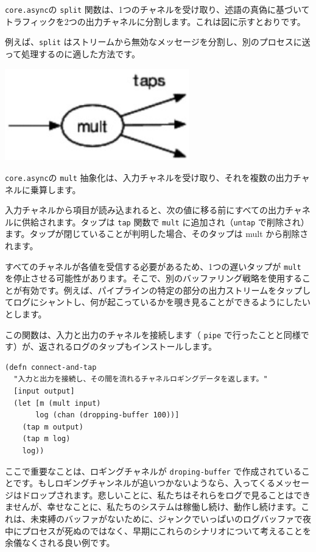 \texttt{core.async}の \texttt{split} 関数は、1つのチャネルを受け取り、述語の真偽に基づいてトラフィックを2つの出力チャネルに分割します。これは図に示すとおりです。

例えば、\texttt{split} はストリームから無効なメッセージを分割し、別のプロセスに送って処理するのに適した方法です。


\includegraphics[width=8cm]{fig_06_004.eps}

\texttt{core.async}の \texttt{mult} 抽象化は、入力チャネルを受け取り、それを複数の出力チャネルに乗算します。

入力チャネルから項目が読み込まれると、次の値に移る前にすべての出力チャネルに供給されます。タップは \texttt{tap} 関数で \texttt{mult} に追加され（\texttt{untap} で削除され）ます。タップが閉じていることが判明した場合、そのタップは mult から削除されます。

すべてのチャネルが各値を受信する必要があるため、1つの遅いタップが \texttt{mult} を停止させる可能性があります。そこで、別のバッファリング戦略を使用することが有効です。例えば、パイプラインの特定の部分の出力ストリームをタップしてログにシャントし、何が起こっているかを覗き見ることができるようにしたいとします。

この関数は、入力と出力のチャネルを接続します（ \texttt{pipe} で行ったことと同様です）が、返されるログのタップもインストールします。


\begin{lstlisting}[numbers=none]
(defn connect-and-tap
  "入力と出力を接続し、その間を流れるチャネルロギングデータを返します。"
  [input output]
  (let [m (mult input)
       log (chan (dropping-buffer 100))]
    (tap m output)
    (tap m log)
    log))
\end{lstlisting}

ここで重要なことは、ロギングチャネルが \texttt{droping-buffer} で作成されていることです。もしロギングチャンネルが追いつかないようなら、入ってくるメッセージはドロップされます。悲しいことに、私たちはそれらをログで見ることはできませんが、幸せなことに、私たちのシステムは稼働し続け、動作し続けます。これは、未束縛のバッファがないために、ジャンクでいっぱいのログバッファで夜中にプロセスが死ぬのではなく、早期にこれらのシナリオについて考えることを余儀なくされる良い例です。

